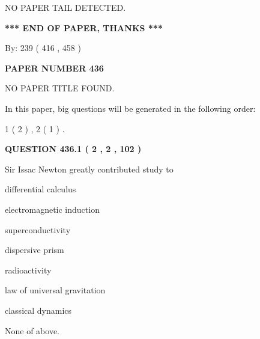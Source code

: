 \documentclass[12pt]{article}
\begin{document}
   
   
   
\vspace{2.0in} NO PAPER TAIL DETECTED.
   
   
   
   
\vspace{1.0in} 
{\textbf{\large{ *** END OF PAPER, THANKS *** }}} 
   
   
\hspace{1.0in} By: 
 239 ( 416 ,  458 )
   
   
   
   
\newpage 
\setcounter{page}{ 
   436001 } 
   
   
   
   
 {\textbf{ \Large{ PAPER NUMBER  436  }}}
   
   
\vspace{0.2in}
   
   
   
   
   
   
 NO PAPER TITLE FOUND.
   
   
   
\vspace{0.2in}
   
In this paper, big questions will be generated in the following order: 
   
   
   1 ( 2 )
 ,
   2 ( 1 )
 .
  
\vspace{0.2in}
  
{\textbf{\Large{QUESTION
436.1 
 ( 2 , 2 , 102 )
}}}
  
  
Sir Issac Newton greatly contributed study to
 
 
differential calculus
 
 
electromagnetic induction
 
 
superconductivity
 
 
dispersive prism
 
 
radioactivity
 
 
law of universal gravitation
 
 
classical dynamics
 
 
 None of above.
 
 
\noindent{}
 
\end{document}
